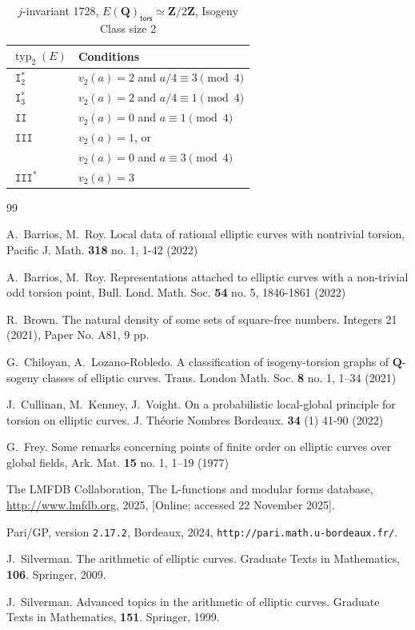 \documentclass{amsart}
\newcommand{\Z}{\mathbf{Z}}
\newcommand{\Q}{\mathbf{Q}}
\newcommand{\tors}{\mathsf{tors}}
\DeclareMathOperator{\typ}{{typ}}
\DeclareMathOperator{\I}{\mathtt{I}}
\DeclareMathOperator{\II}{\mathtt{II}}
\DeclareMathOperator{\III}{\mathtt{III}}
\numberwithin{equation}{section}
\theoremstyle{plain}
\theoremstyle{remark}
\begin{document}
\begin{center}
 \begin{table}[h]
 \begin{tabular}{|l|l|}
 \hline
$\typ_2(E)$ & Conditions \\
 \hline
 $\I_2^*$ & $v_2(a)=2$ and $a/4 \equiv 3 \pmod{4}$ \\
$\I_3^*$ & $v_2(a) = 2$ and $a/4 \equiv 1 \pmod{4}$\\
$\II$ & $v_2(a)=0$ and $a \equiv 1 \pmod{4}$\\
$\III$ & $v_2(a)=1$, or \\
 &$v_2(a)=0$ and $a \equiv 3 \pmod{4}$\\
 $\III^*$ & $v_2(a)=3$ \\
\hline
\end{tabular}
 \caption{$j$-invariant 1728, $E(\Q)_\tors \simeq \Z/2\Z$, Isogeny Class size 2} \label{j1728-generic}
 \end{table}
 \end{center}

\newpage

\begin{thebibliography}{99}

 A.~Barrios, M.~Roy. Local data of rational elliptic curves with nontrivial torsion, Pacific
J. Math. \textbf{318} no. 1, 1-42  (2022)

 A.~Barrios, M.~Roy. Representations attached to elliptic curves with a non-trivial odd torsion point, Bull. Lond. Math.
Soc. \textbf{54} no. 5, 1846-1861  (2022)

 R.~Brown. The natural density of some sets of square-free numbers. Integers 21 (2021), Paper No. A81, 9 pp.

 G.~Chiloyan, A.~Lozano-Robledo. A classification of isogeny-torsion graphs of $\Q$-sogeny classes of elliptic curves.
Trans. London Math. Soc. \textbf{8} no. 1, 1–34 (2021)

 J.~Cullinan, M.~Kenney, J.~Voight. On a probabilistic local-global principle for torsion on elliptic curves. J. Th\'eorie Nombres Bordeaux. \textbf{34} (1) 41-90 (2022)

 G.~Frey. Some remarks concerning points of finite order on elliptic curves over global fields, Ark. Mat.
\textbf{15} no. 1, 1–19 (1977)

 The LMFDB Collaboration, The L-functions and modular forms database, \href{http://www.lmfdb.org}{http://www.lmfdb.org}, 2025, [Online; accessed 22 November 2025].

 Pari/GP, version {\tt 2.17.2}, Bordeaux, 2024, {\tt http://pari.math.u-bordeaux.fr/}.

 J.~Silverman. The arithmetic of elliptic curves. Graduate Texts in Mathematics, \textbf{106}. Springer, 2009. 

 J.~Silverman. Advanced topics in the arithmetic of elliptic curves. Graduate Texts in Mathematics, \textbf{151}. Springer, 1999. 
\end{thebibliography}
\end{document}
